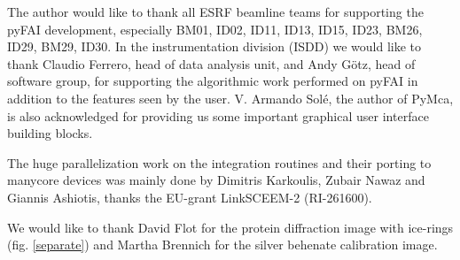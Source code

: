 \documentclass[preprint]{iucr}
\begin{document}

The author would like to thank all ESRF beamline teams for supporting the
pyFAI development, especially BM01, ID02, ID11, ID13, ID15, ID23, BM26, ID29, BM29,
ID30. In the instrumentation division (ISDD) we would like to thank Claudio
Ferrero, head of data analysis unit, and Andy G\"otz, head of software group, for
supporting the algorithmic work performed on pyFAI in addition to the features
seen by the user.
V. Armando Solé, the author of PyMca, is also acknowledged for providing us some
important graphical user interface building blocks.
  
The huge parallelization work on the integration routines and their porting to
manycore devices was mainly done by Dimitris Karkoulis, Zubair Nawaz and Giannis Ashiotis,
thanks the EU-grant LinkSCEEM-2 (RI-261600).

We would like to thank David Flot for the protein
diffraction image with ice-rings (fig. \ref{separate}) and Martha Brennich for
the silver behenate calibration image.
\end{document}
